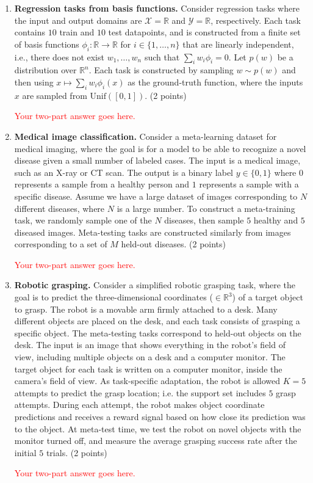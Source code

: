 \documentclass[12pt]{article}
\begin{document}
\begin{enumerate}[label=(\alph*)]
\item \textbf{Regression tasks from basis functions.}
Consider regression tasks where the input and output domains are $\mathcal{X} = \mathbb{R}$ and $\mathcal{Y} = \mathbb{R}$, respectively.
Each task contains $10$ train and $10$ test datapoints, and is constructed from a finite set of basis functions $\phi_i: \mathbb{R} \rightarrow \mathbb{R}$ for $i \in \{1, \ldots, n\}$ that are linearly independent, i.e., there does not exist $w_1, \ldots, w_n$ such that $\sum_i w_i \phi_i = 0$.
Let $p(w)$ be a distribution over $\mathbb{R}^n$. 
Each task is constructed by sampling $w \sim p(w)$ and then using $x \mapsto \sum_i w_i \phi_i(x)$ as the ground-truth function, where the inputs $x$ are sampled from $\textrm{Unif}([0, 1])$.
(2 points)

\textcolor{red}{Your two-part answer goes here.}

\item \textbf{Medical image classification.}
Consider a meta-learning dataset for medical imaging, where the goal is for a model to be able to recognize a novel disease given a small number of labeled cases.
The input is a medical image, such as an X-ray or CT scan.
The output is a binary label $y \in \{0, 1\}$ where $0$ represents a sample from a healthy person and $1$ represents a sample with a specific disease.
Assume we have a large dataset of images corresponding to $N$ different diseases, where $N$ is a large number.
To construct a meta-training task, we randomly sample one of the $N$ diseases, then sample $5$ healthy and $5$ diseased images.
Meta-testing tasks are constructed similarly from images corresponding to a set of $M$ held-out diseases.
(2 points)

\textcolor{red}{Your two-part answer goes here.}

\item \textbf{Robotic grasping.}
Consider a simplified robotic grasping task, where the goal is to predict the three-dimensional coordinates ($\in \mathbb{R}^3$) of a target object to grasp.
The robot is a movable arm firmly attached to a desk.
Many different objects are placed on the desk, and each task consists of grasping a specific object. The meta-testing tasks correspond to held-out objects on the desk.
The input is an image that shows everything in the robot's field of view, including multiple objects on a desk and a computer monitor.
The target object for each task is written on a computer monitor, inside the camera's field of view.
As task-specific adaptation, the robot is allowed $K=5$ attempts to predict the grasp location; i.e. the support set includes $5$ grasp attempts.
During each attempt, the robot makes object coordinate predictions and receives a reward signal based on how close its prediction was to the object.
At meta-test time, we test the robot on novel objects with the monitor turned off, and measure the average grasping success rate after the initial $5$ trials.
(2 points)

\textcolor{red}{Your two-part answer goes here.}

\end{enumerate}
\end{document}

